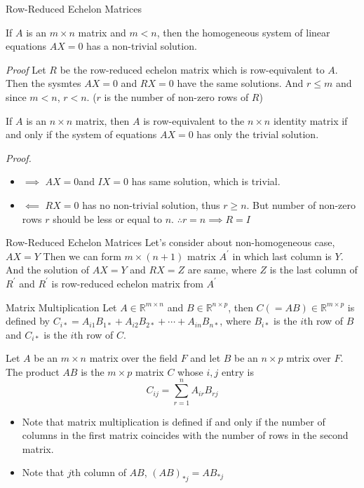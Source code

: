 \documentclass[8pt]{beamer}
\newcommand{\mbb}[1]{\mathbb{#1}}
\newcommand{\ti}[1]{\textit{#1}}
\begin{document}
\begin{frame}{Row-Reduced Echelon Matrices}
  \begin{theorem}
    If $A$ is an $m \times n$ matrix and $m < n$, then the homogeneous system of linear equations $AX=0$ has a non-trivial solution.
  \end{theorem}
  \ti{Proof} Let $R$ be the row-reduced echelon matrix which is row-equivalent to $A$. Then the sysmtes $AX = 0$ and $RX=0$ have the same solutions. And $r \leq m$ and since $m < n$, $r < n$. ($r$ is the number of non-zero rows of $R$)

  \begin{theorem}
    If $A$ is an $n \times n$ matrix, then $A$ is row-equivalent to the $n\times n$ identity matrix if and only if the system of equations $AX = 0$ has only the trivial solution.
  \end{theorem}
  \ti{Proof.} 
  \begin{itemize}
    \item $\implies$ $AX =0 $and $IX = 0$ has same solution, which is trivial.
    \item  $\impliedby$  $RX = 0$ has no non-trivial solution, thus $r \geq n$. But number of non-zero rows $r$ should be less or equal to $n$. $\therefore r = n \implies R = I$
  \end{itemize}
\end{frame}

\begin{frame}{Row-Reduced Echelon Matrices}
  Let's consider about non-homogeneous case, $AX = Y$
  Then we can form $m \times (n +1)$ matrix $A^\prime$ in which last column is $Y$. And the solution of $AX=Y$ and $RX=Z$ are same, where $Z$ is the last column of $R^\prime$ and $R^\prime$ is row-reduced echelon matrix from $A^\prime$
\end{frame}

\begin{frame}{Matrix Multiplication}
  Let $A \in \mbb{R}^{m \times n}$ and $B \in \mbb{R}^{n \times p}$, then $C (= AB) \in \mbb{R}^{m \times p}$ is defined by $C_{i *} = A_{i1}B_{1 *} + A_{i2} B_{2 *} + \cdots + A_{in} B_{n*}$, where $B_{i *}$ is the $i$th row of $B$ and $C_{i*}$ is the $i$th row of $C$.

  \begin{definition}
    Let $A$ be an $m \times n $ matrix over the field $F$ and let $B$ be an $n \times p$ mtrix over $F$. The product $AB$ is the $m \times p$ matrix $C$ whose $i,j$ entry is
    \[
      C_{ij} = \sum_{r=1}^n A_{ir}B_{rj}
    \]
  \end{definition}

  \begin{itemize}
    \item Note that matrix multiplication is defined if and only if the number of columns in the first matrix coincides with the number of rows in the second matrix.
    \item Note that $j$th column of $AB$, $(AB)_{*j} = AB_{*j}$
  \end{itemize}
\end{frame}
\end{document}

